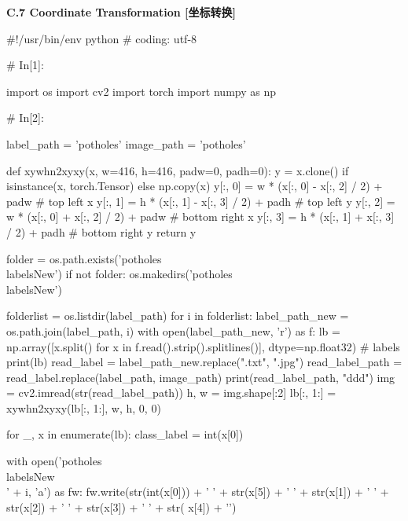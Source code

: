 \documentclass{MathorCupmodeling}
\begin{document}
\textbf{C.7 Coordinate Transformation [坐标转换]}
\begin{python}
#!/usr/bin/env python
# coding: utf-8

# In[1]:


import os
import cv2
import torch
import numpy as np

# In[2]:


label_path = 'potholes'
image_path = 'potholes\images'


def xywhn2xyxy(x, w=416, h=416, padw=0, padh=0):
    y = x.clone() if isinstance(x, torch.Tensor) else np.copy(x)
    y[:, 0] = w * (x[:, 0] - x[:, 2] / 2) + padw  # top left x
    y[:, 1] = h * (x[:, 1] - x[:, 3] / 2) + padh  # top left y
    y[:, 2] = w * (x[:, 0] + x[:, 2] / 2) + padw  # bottom right x
    y[:, 3] = h * (x[:, 1] + x[:, 3] / 2) + padh  # bottom right y
    return y


folder = os.path.exists('potholes\\labelsNew')
if not folder:
    os.makedirs('potholes\\labelsNew')

folderlist = os.listdir(label_path)
for i in folderlist:
    label_path_new = os.path.join(label_path, i)
    with open(label_path_new, 'r') as f:
        lb = np.array([x.split() for x in f.read().strip().splitlines()], dtype=np.float32)  # labels
        print(lb)
    read_label = label_path_new.replace(".txt", ".jpg")
    read_label_path = read_label.replace(label_path, image_path)
    print(read_label_path, "ddd")
    img = cv2.imread(str(read_label_path))
    h, w = img.shape[:2]
    lb[:, 1:] = xywhn2xyxy(lb[:, 1:], w, h, 0, 0)

    for _, x in enumerate(lb):
        class_label = int(x[0])

        with open('potholes\\labelsNew\\' + i, 'a') as fw:
            fw.write(str(int(x[0])) + ' ' + str(x[5]) + ' ' + str(x[1]) + ' ' + str(x[2]) + ' ' + str(x[3]) + ' ' + str(
                x[4]) + '\n')
\end{python}
\end{document}
